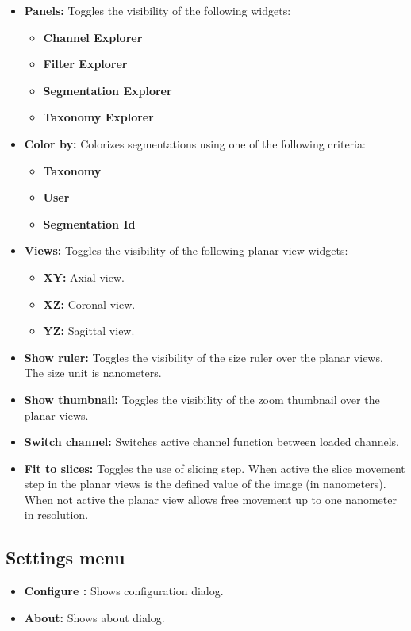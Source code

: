 \begin{itemize}
\item \textbf{Panels:} Toggles the visibility of the following widgets:
	\begin{itemize}
	\item \textbf{Channel Explorer}
	\item \textbf{Filter Explorer}
	\item \textbf{Segmentation Explorer}
	\item \textbf{Taxonomy Explorer}
	\end{itemize}
\item \textbf{Color by:} Colorizes segmentations using one of the following criteria:
	\begin{itemize}
	\item \textbf{Taxonomy}
	\item \textbf{User}
	\item \textbf{Segmentation Id}
	\end{itemize}
\item \textbf{Views:} Toggles the visibility of the following planar view widgets:
	\begin{itemize}
	\item \textbf{XY:} Axial view.
	\item \textbf{XZ:} Coronal view.
	\item \textbf{YZ:} Sagittal view.
	\end{itemize}
\item \textbf{Show ruler:} Toggles the visibility of the size ruler over the planar views. The size unit is nanometers.
\item \textbf{Show thumbnail:} Toggles the visibility of the zoom thumbnail over the planar views.
\item \textbf{Switch channel:} Switches active channel function between loaded channels.
\item \textbf{Fit to slices:} Toggles the use of slicing step. When active the slice movement step in the planar views is the defined value of the image (in nanometers).
When not active the planar view allows free movement up to one nanometer in resolution.
\end{itemize}

\subsection{Settings menu}

\begin{itemize}
\item \textbf{Configure \espina:} Shows \espina{} configuration dialog.
\item \textbf{About:} Shows \espina{} about dialog.
\end{itemize}



